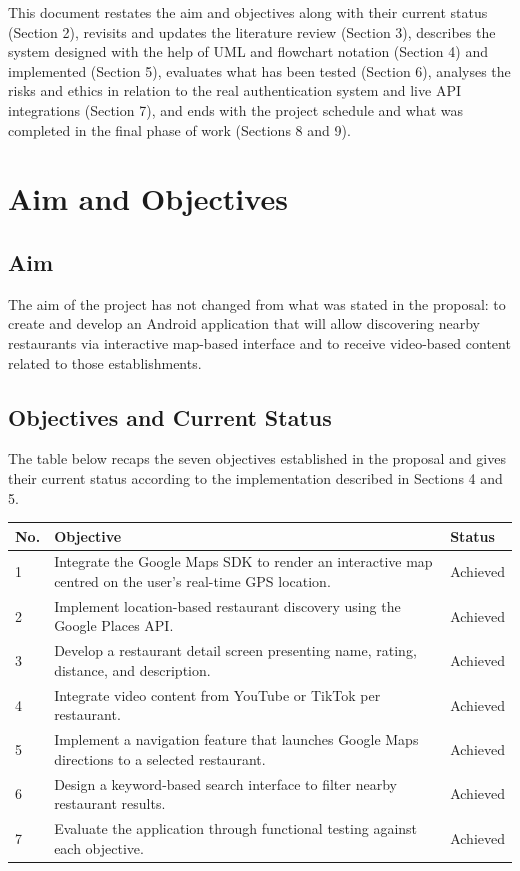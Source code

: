 \documentclass[12pt, a4paper]{article}
\begin{document}
This document restates the aim and objectives along with their current status (Section 2), revisits and updates the literature review (Section 3), describes the system designed with the help of UML and flowchart notation (Section 4) and implemented (Section 5), evaluates what has been tested (Section 6), analyses the risks and ethics in relation to the real authentication system and live API integrations (Section 7), and ends with the project schedule and what was completed in the final phase of work (Sections 8 and 9).

\section{Aim and Objectives}

\subsection*{Aim}

The aim of the project has not changed from what was stated in the proposal: to create and develop an Android application that will allow discovering nearby restaurants via interactive map-based interface and to receive video-based content related to those establishments.

\subsection*{Objectives and Current Status}

The table below recaps the seven objectives established in the proposal and gives their current status according to the implementation described in Sections 4 and 5.

\begin{center}
\renewcommand{\arraystretch}{1.3}
\begin{tabular}{p{} p{} p{}}
\toprule
\textbf{No.} & \textbf{Objective} & \textbf{Status} \\
\midrule
1 & Integrate the Google Maps SDK to render an interactive map centred on the user's real-time GPS location. & Achieved \\
2 & Implement location-based restaurant discovery using the Google Places API. & Achieved \\
3 & Develop a restaurant detail screen presenting name, rating, distance, and description. & Achieved \\
4 & Integrate video content from YouTube or TikTok per restaurant. & Achieved \\
5 & Implement a navigation feature that launches Google Maps directions to a selected restaurant. & Achieved \\
6 & Design a keyword-based search interface to filter nearby restaurant results. & Achieved \\
7 & Evaluate the application through functional testing against each objective. & Achieved \\
\bottomrule
\end{tabular}
\end{center}
\end{document}
